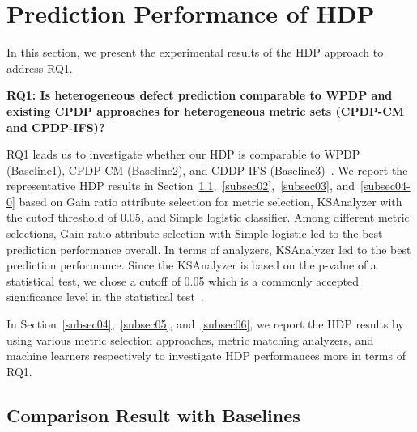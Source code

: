 \section{Prediction Performance of HDP}
\label{sec:Result}
In this section, we present the experimental results of the HDP approach to address RQ1.

{\bf RQ1: Is heterogeneous defect prediction comparable to WPDP and existing CPDP approaches for heterogeneous metric sets (CPDP-CM and CPDP-IFS)?}

RQ1 leads us to investigate whether our
HDP is comparable to WPDP (Baseline1), CPDP-CM
(Baseline2), and CDDP-IFS (Baseline3)~\cite{He14}. We report the representative HDP results in Section~\ref{subsec01},~\ref{subsec02},~\ref{subsec03}, and~\ref{subsec04-0} based on Gain ratio attribute selection for metric selection, KSAnalyzer with the cutoff threshold of 0.05, and Simple logistic classifier. Among different
metric selections, Gain ratio attribute selection with Simple logistic led to the best
prediction performance overall. In terms of analyzers, KSAnalyzer led to the best prediction performance.
Since the KSAnalyzer is based on the p-value of a statistical test, we chose a cutoff of 0.05 which is a commonly accepted significance level in the
statistical test~\cite{Corder09}.

In Section~\ref{subsec04},~\ref{subsec05}, and~\ref{subsec06}, we report the HDP results by using various metric selection approaches, metric matching analyzers, and machine learners respectively to investigate HDP performances more in terms of RQ1.

\subsection{Comparison Result with Baselines}
\label{subsec01}%

